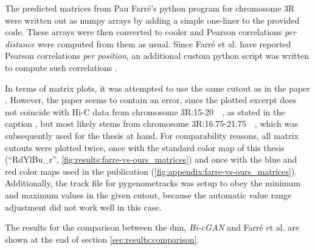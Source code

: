 The predicted matrices from Pau Farr\'e's python program for chromosome 3R were written out as numpy arrays by adding a simple one-liner to the provided code. 
These arrays were then converted to cooler and Pearson correlations \emph{per distance} were computed from them as usual.
Since Farr\'e et al. have reported Pearson correlations \emph{per position}, an additional custom python script 
was written to compute such correlations \cite[scripts/corr\_per\_pos.py]{Krauth2021b}.

In terms of matrix plots, it was attempted to use the same cutout as in the paper \cite{Farre2018a}.
However, the paper seems to contain an error, since the plotted excerpt does not coincide with Hi-C data from chromosome 3R:15-\SI{20}{\mega\bp}, 
as stated in the caption \cite[fig.~2]{Farre2018a}, but most likely stems from chromosome 3R:16.75-\SI{21.75}{\mega\bp},
which was subsequently used for the thesis at hand.
For comparability reasons, all matrix cutouts were plotted twice, once with the standard color map of this thesis (``RdYlBu\_r'', \cref{fig:results:farre-vs-ours_matrices}) and once
with the blue and red color maps used in the publication \cite{Farre2018a} (\cref{fig:appendix:farre-vs-ours_matrices}).
Additionally, the track file for pygenometracks was setup to obey the minimum and maximum values in the given cutout, 
because the automatic value range adjustment did not work well in this case.

The results for the comparison between the \acrshort{dnn}, \emph{Hi-cGAN} and Farr\'e et al. are shown at the end of section \ref{sec:results:comparison}.



\clearpage
